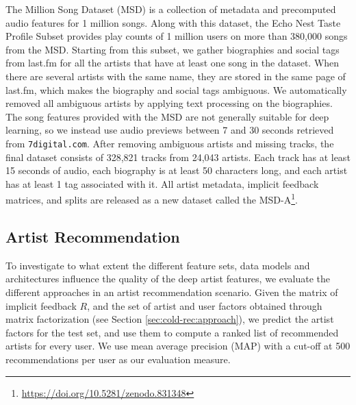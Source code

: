 The Million Song Dataset (MSD) \citep{McFee2012} is a collection of metadata and precomputed audio features for 1 million songs. 
Along with this dataset, the Echo Nest Taste Profile Subset \citep{Bertin-Mahieux2011} provides play counts of 1 million users on more than 380,000 songs from the MSD.
Starting from this subset, we gather biographies and social tags from last.fm for all the artists that have at least one song in the dataset.
When there are several artists with the same name, they are stored in the same page of last.fm, which makes the biography and social tags ambiguous. 
We automatically removed all ambiguous artists by applying text processing on the biographies. 
The song features provided with the MSD are not generally suitable for deep learning, so we instead use audio previews between 7 and 30 seconds retrieved from \texttt{7digital.com}.
After removing ambiguous artists and missing tracks, the final dataset consists of 328,821 tracks from 24,043 artists. 
Each track has at least 15 seconds of audio, each biography is at least 50 characters long, and each artist has at least 1 tag associated with it. All artist metadata, implicit feedback matrices, and splits are released as a new dataset called the MSD-A\footnote{\url{https://doi.org/10.5281/zenodo.831348}}.

\subsection{Artist Recommendation}
\label{sec:cold-rec:artist-rec}

To investigate to what extent the different feature sets, data models and architectures influence the quality of the deep artist features, we evaluate the different approaches in an artist recommendation scenario. Given the matrix of implicit feedback $R$, and the set of artist and user factors obtained through matrix factorization (see Section \ref{sec:cold-rec:approach}), we predict the artist factors for the test set, and use them to compute a ranked list of recommended artists for every user. We use mean average precision (MAP) with a cut-off at 500 recommendations per user as our evaluation measure. 

